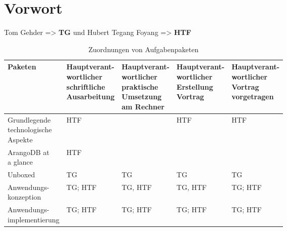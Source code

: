 
\chapter*{Vorwort}
Tom Gehder  => \textbf{TG}         und       Hubert Tegang Foyang =>  \textbf{HTF}

\begin{table}[h]
\begin{tabular}{|l|l|l|l|l|}
\hline
Paketen & \pbox{20cm}{Hauptverant- \\ wortlicher \\ schriftliche \\ Ausarbeitung} & \pbox{20cm}{Hauptverant- \\ wortlicher \\ praktische \\Umsetzung \\ am Rechner} & \pbox{20cm}{Hauptverant- \\ wortlicher \\ Erstellung \\ Vortrag} & \pbox{20cm}{Hauptverant- \\ wortlicher \\ Vortrag \\ vorgetragen} \\ \hline
\pbox{20cm}{Grundlegende \\ technologische \\ Aspekte} & HTF &  & HTF & HTF \\ \hline
\pbox{20cm}{ArangoDB at \\ a glance} & HTF &  &  &  \\ \hline
Unboxed & TG & TG & TG & TG \\ \hline
\pbox{20cm}{Anwendungs- \\ konzeption} & TG; HTF & TG, HTF & TG, HTF & TG; HTF \\ \hline

\pbox{20cm}{Anwendungs- \\ implementierung} & TG; HTF & TG; HTF & TG; HTF & TG; HTF \\\hline
\end{tabular}
\caption{Zuordnungen von Aufgabenpaketen}
\end{table}